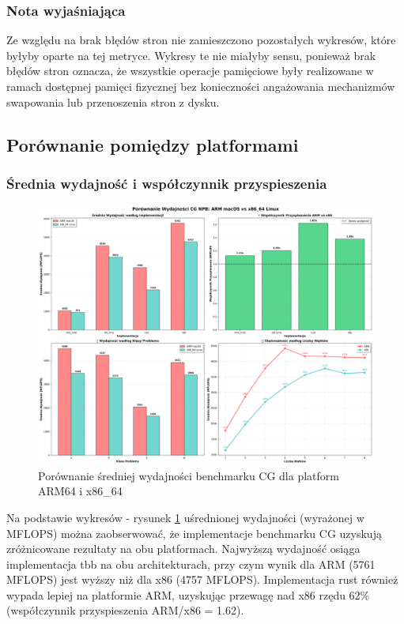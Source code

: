 \subsubsection{Nota wyjaśniająca}
Ze względu na brak błędów stron nie zamieszczono pozostałych wykresów, które byłyby oparte na tej metryce. Wykresy te nie miałyby sensu, ponieważ brak błędów stron oznacza, że wszystkie operacje pamięciowe były realizowane w ramach dostępnej pamięci fizycznej bez konieczności angażowania mechanizmów swapowania lub przenoszenia stron z dysku.

\subsection{Porównanie pomiędzy platformami}
\subsubsection{Średnia wydajność i współczynnik przyspieszenia}
\begin{figure}[H]
    \centering
    \includegraphics[width=\textwidth]{analiza/images/parallel/cg/compare/cg_porownanie_platform_arm_vs_x86.png}
    \caption{Porównanie średniej wydajności benchmarku CG dla platform ARM64 i x86\_64}
    \label{cg_porownanie_platform_arm_vs_x86}
\end{figure}
Na podstawie wykresów - rysunek \ref{cg_porownanie_platform_arm_vs_x86} uśrednionej wydajności (wyrażonej w MFLOPS) można zaobserwować, że implementacje benchmarku CG uzyskują zróżnicowane rezultaty na obu platformach. Najwyższą wydajność osiąga implementacja tbb na obu architekturach, przy czym wynik dla ARM (5761 MFLOPS) jest wyższy niż dla x86 (4757 MFLOPS). Implementacja rust również wypada lepiej na platformie ARM, uzyskując przewagę nad x86 rzędu 62\% (współczynnik przyspieszenia ARM/x86 = 1.62).

